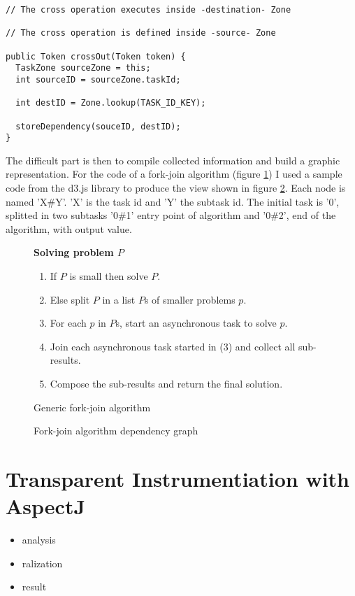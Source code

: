 \begin{lstlisting}
// The cross operation executes inside -destination- Zone

// The cross operation is defined inside -source- Zone

public Token crossOut(Token token) {
  TaskZone sourceZone = this;
  int sourceID = sourceZone.taskId;

  int destID = Zone.lookup(TASK_ID_KEY);

  storeDependency(souceID, destID);
}
\end{lstlisting}

The difficult part is then to compile collected information and build a graphic representation. For the code of a fork-join algorithm (figure \ref{fig:fj-alg}) I used a sample code from the d3.js library to produce the view shown in figure \ref{fig:fjt-bundle}. Each node is named 'X\#Y'. 'X' is the task id and 'Y' the subtask id. The initial task is '0', splitted in two subtasks '0\#1' entry point of algorithm and '0\#2', end of the algorithm, with output value.

\begin{figure}[h]
  \textbf{Solving problem $P$}
  \begin{enumerate}
  \item If $P$ is small then solve $P$.
  \item Else split $P$ in a list $P$s of smaller problems $p$.
  \item For each $p$ in $P$s, start an asynchronous task to solve $p$.
  \item Join each asynchronous task started in (3) and collect all sub-results.
  \item Compose the sub-results and return the final solution.
  \end{enumerate}
\caption{Generic fork-join algorithm}
\label{fig:fj-alg}
\end{figure}

\begin{figure}
  \centering
  \caption{Fork-join algorithm dependency graph}
  \label{fig:fjt-bundle}
\end{figure}


\section{Transparent Instrumentiation with AspectJ}



\begin{itemize}
\item analysis
\item ralization
\item result
\end{itemize}

